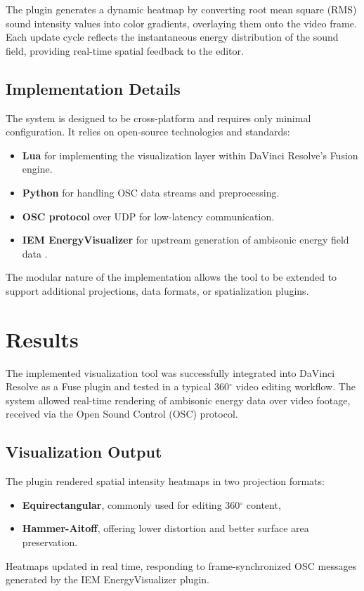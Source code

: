 \documentclass[convention,student-expo]{aesconf} %
\begin{document}
The plugin generates a dynamic heatmap by converting root mean square (RMS) sound intensity values into color gradients, overlaying them onto the video frame. Each update cycle reflects the instantaneous energy distribution of the sound field, providing real-time spatial feedback to the editor.

\subsection{Implementation Details}

The system is designed to be cross-platform and requires only minimal configuration. It relies on open-source technologies and standards:
\begin{itemize}
    \item \textbf{Lua} for implementing the visualization layer within DaVinci Resolve's Fusion engine.
    \item \textbf{Python} for handling OSC data streams and preprocessing.
    \item \textbf{OSC protocol} over UDP for low-latency communication.
    \item \textbf{IEM EnergyVisualizer} for upstream generation of ambisonic energy field data \citep{rudrich2019iem}.
\end{itemize}

The modular nature of the implementation allows the tool to be extended to support additional projections, data formats, or spatialization plugins.

\section{Results}

The implemented visualization tool was successfully integrated into DaVinci Resolve as a Fuse plugin and tested in a typical 360$^\circ$ video editing workflow. The system allowed real-time rendering of ambisonic energy data over video footage, received via the Open Sound Control (OSC) protocol.

\subsection{Visualization Output}

The plugin rendered spatial intensity heatmaps in two projection formats:
\begin{itemize}
    \item \textbf{Equirectangular}, commonly used for editing 360$^\circ$ content,
    \item \textbf{Hammer-Aitoff}, offering lower distortion and better surface area preservation.
\end{itemize}
Heatmaps updated in real time, responding to frame-synchronized OSC messages generated by the IEM EnergyVisualizer plugin.
\end{document}
